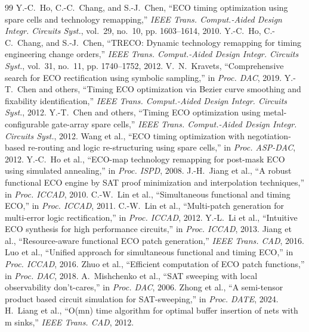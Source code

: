 \documentclass[journal]{IEEEtran}
\begin{document}
\begin{thebibliography}{99}
 Y.-C.~Ho, C.-C.~Chang, and S.-J.~Chen, ``ECO timing optimization using spare cells and technology remapping,'' \emph{IEEE Trans. Comput.-Aided Design Integr. Circuits Syst.}, vol.~29, no.~10, pp. 1603--1614, 2010.
 Y.-C.~Ho, C.-C.~Chang, and S.-J.~Chen, ``TRECO: Dynamic technology remapping for timing engineering change orders,'' \emph{IEEE Trans. Comput.-Aided Design Integr. Circuits Syst.}, vol.~31, no.~11, pp. 1740--1752, 2012.
 V.~N.~Kravets, ``Comprehensive search for ECO rectification using symbolic sampling,'' in \emph{Proc. DAC}, 2019.
 Y.-T.~Chen and others, ``Timing ECO optimization via Bezier curve smoothing and fixability identification,'' \emph{IEEE Trans. Comput.-Aided Design Integr. Circuits Syst.}, 2012.
 Y.-T.~Chen and others, ``Timing ECO optimization using metal-configurable gate-array spare cells,'' \emph{IEEE Trans. Comput.-Aided Design Integr. Circuits Syst.}, 2012.
 Wang et al., ``ECO timing optimization with negotiation-based re-routing and logic re-structuring using spare cells,'' in \emph{Proc. ASP-DAC}, 2012.
 Y.-C.~Ho et al., ``ECO-map technology remapping for post-mask ECO using simulated annealing,'' in \emph{Proc. ISPD}, 2008.
 J.-H.~Jiang et al., ``A robust functional ECO engine by SAT proof minimization and interpolation techniques,'' in \emph{Proc. ICCAD}, 2010.
 C.-W.~Lin et al., ``Simultaneous functional and timing ECO,'' in \emph{Proc. ICCAD}, 2011.
 C.-W.~Lin et al., ``Multi-patch generation for multi-error logic rectification,'' in \emph{Proc. ICCAD}, 2012.
 Y.-L.~Li et al., ``Intuitive ECO synthesis for high performance circuits,'' in \emph{Proc. ICCAD}, 2013.
 Jiang et al., ``Resource-aware functional ECO patch generation,'' \emph{IEEE Trans. CAD}, 2016.
 Luo et al., ``Unified approach for simultaneous functional and timing ECO,'' in \emph{Proc. ICCAD}, 2016.
 Zhuo et al., ``Efficient computation of ECO patch functions,'' in \emph{Proc. DAC}, 2018.
 A.~Mishchenko et al., ``SAT sweeping with local observability don't-cares,'' in \emph{Proc. DAC}, 2006.
 Zhong et al., ``A semi-tensor product based circuit simulation for SAT-sweeping,'' in \emph{Proc. DATE}, 2024.
 H.~Liang et al., ``O(mn) time algorithm for optimal buffer insertion of nets with m sinks,'' \emph{IEEE Trans. CAD}, 2012.

\end{thebibliography}
\end{document}
